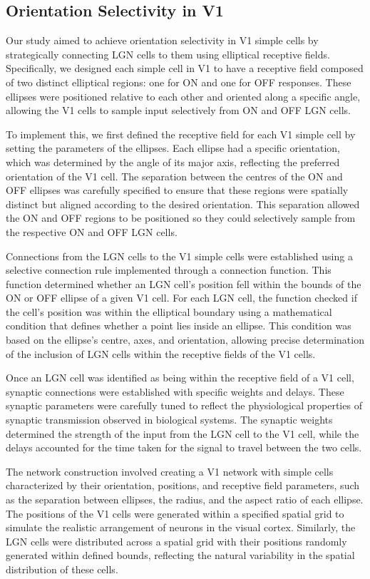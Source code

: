 \documentclass[12pt]{article}
\begin{document}
\subsection{Orientation Selectivity in V1}
Our study aimed to achieve orientation selectivity in V1 simple cells by strategically connecting LGN cells to them using elliptical receptive fields. Specifically, we designed each simple cell in V1 to have a receptive field composed of two distinct elliptical regions: one for ON and one for OFF responses. These ellipses were positioned relative to each other and oriented along a specific angle, allowing the V1 cells to sample input selectively from ON and OFF LGN cells.

To implement this, we first defined the receptive field for each V1 simple cell by setting the parameters of the ellipses. Each ellipse had a specific orientation, which was determined by the angle of its major axis, reflecting the preferred orientation of the V1 cell. The separation between the centres of the ON and OFF ellipses was carefully specified to ensure that these regions were spatially distinct but aligned according to the desired orientation. This separation allowed the ON and OFF regions to be positioned so they could selectively sample from the respective ON and OFF LGN cells.

Connections from the LGN cells to the V1 simple cells were established using a selective connection rule implemented through a connection function. This function determined whether an LGN cell's position fell within the bounds of the ON or OFF ellipse of a given V1 cell. For each LGN cell, the function checked if the cell's position was within the elliptical boundary using a mathematical condition that defines whether a point lies inside an ellipse. This condition was based on the ellipse's centre, axes, and orientation, allowing precise determination of the inclusion of LGN cells within the receptive fields of the V1 cells.

Once an LGN cell was identified as being within the receptive field of a V1 cell, synaptic connections were established with specific weights and delays. These synaptic parameters were carefully tuned to reflect the physiological properties of synaptic transmission observed in biological systems. The synaptic weights determined the strength of the input from the LGN cell to the V1 cell, while the delays accounted for the time taken for the signal to travel between the two cells.

The network construction involved creating a V1 network with simple cells characterized by their orientation, positions, and receptive field parameters, such as the separation between ellipses, the radius, and the aspect ratio of each ellipse. The positions of the V1 cells were generated within a specified spatial grid to simulate the realistic arrangement of neurons in the visual cortex. Similarly, the LGN cells were distributed across a spatial grid with their positions randomly generated within defined bounds, reflecting the natural variability in the spatial distribution of these cells.
\end{document}
